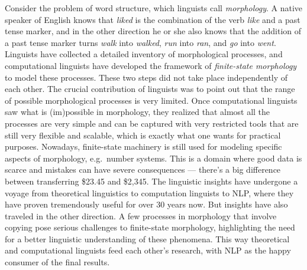 Consider the problem of word structure, which linguists call \emph{morphology}.
A native speaker of English knows that \emph{liked} is the combination of the verb \emph{like} and a past tense marker, and in the other direction he or she also knows that the addition of a past tense marker turns \emph{walk} into \emph{walked}, \emph{run} into \emph{ran}, and \emph{go} into \emph{went}.
Linguists have collected a detailed inventory of morphological processes, and computational linguists have developed the framework of \emph{finite-state morphology} to model these processes. 
These two steps did not take place independently of each other.
The crucial contribution of linguists was to point out that the range of possible morphological processes is very limited.
Once computational linguists saw what is (im)possible in morphology, they realized that almost all the processes are very simple and can be captured with very restricted tools that are still very flexible and scalable, which is exactly what one wants for practical purposes.
Nowadays, finite-state machinery is still used for modeling specific aspects of morphology, e.g.~number systems.
This is a domain where good data is scarce and mistakes can have severe consequences --- there's a big difference between transferring \$23.45 and \$2,345.
The linguistic insights have undergone a voyage from theoretical linguistics to computation linguists to NLP, where they have proven tremendously useful for over 30 years now.
But insights have also traveled in the other direction.
A few processes in morphology that involve copying pose serious challenges to finite-state morphology, highlighting the need for a better linguistic understanding of these phenomena.
This way theoretical and computational linguists feed each other's research, with NLP as the happy consumer of the final results.

